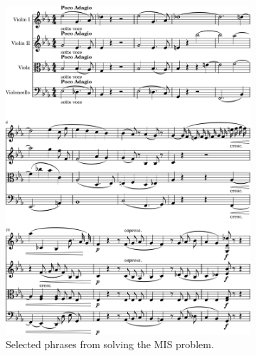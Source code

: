 \documentclass[aps,pra,10pt,twocolumn]{revtex4-2}
\begin{document}
\begin{figure}[h]
\begin{subfigure}[b]{0.5\linewidth}
        \includegraphics[width=\subfigurewidth]{../Figures/excerpt-1.png}
        \caption{Selected phrases from solving the MIS problem.}
    \end{subfigure}\hfill
    \begin{subfigure}[b]{0.5\linewidth}

\end{subfigure}
\end{figure}
\end{document}
